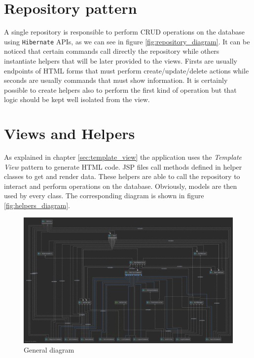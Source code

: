 \documentclass[a4paper]{report}
\begin{document}
	\section{Repository pattern}
	\label{sec:repository}
	
	A single repository is responsible to perform CRUD operations on the database using \texttt{Hibernate} APIs, as we can see in figure \ref{fig:repository_diagram}. It can be noticed that certain commands call directly the repository while others instantiate helpers that will be later provided to the views. Firsts are usually endpoints of HTML forms that must perform create/update/delete actions while seconds are usually commands that must show information. It is certainly possible to create helpers also to perform the first kind of operation but that logic should be kept well isolated from the view.
	
	\section{Views and Helpers}
	\label{sec:views_and_helpers}
	
	As explained in chapter \ref{sec:template_view} the application uses the \textit{Template View} pattern to generate HTML code. JSP files call methods defined in helper classes to get and render data. These helpers are able to call the repository to interact and perform operations on the database. Obviously, models are then used by every class. The corresponding diagram is shown in figure \ref{fig:helpers_diagram}.
	
	\begin{figure}
		\centering
		\includegraphics[width=\textwidth]{images/General.png}
		\caption{General diagram}
		\label{fig:general_diagram}
	\end{figure} 
	
\end{document}
